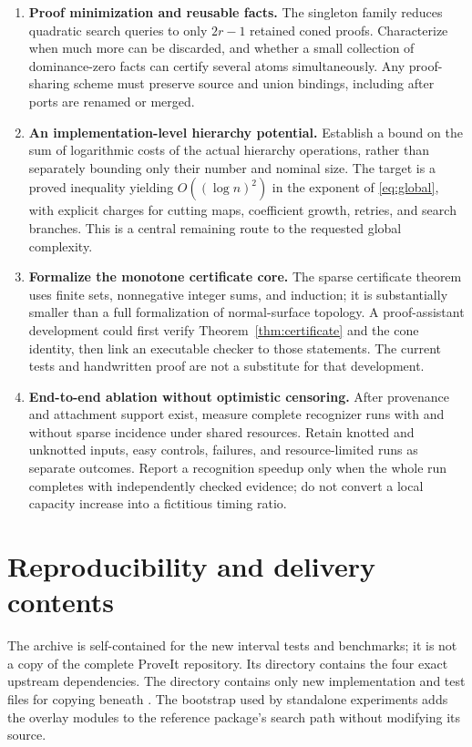 \documentclass[11pt,letterpaper]{article}
\theoremstyle{definition}
\begin{document}
\begin{enumerate}[leftmargin=*,label=\textbf{\arabic*.},itemsep=0.75em]
\item \textbf{Proof minimization and reusable facts.}
The singleton family reduces quadratic search queries to only $2r-1$
retained coned proofs. Characterize when much more can be discarded, and
whether a small collection of dominance-zero facts can certify several
atoms simultaneously. Any proof-sharing scheme must preserve source and
union bindings, including after ports are renamed or merged.

\item \textbf{An implementation-level hierarchy potential.}
Establish a bound on the sum of logarithmic costs of the actual hierarchy
operations, rather than separately bounding only their number and nominal
size. The target is a proved inequality yielding
$O((\log n)^2)$ in the exponent of \eqref{eq:global}, with explicit charges
for cutting maps, coefficient growth, retries, and search branches. This
is a central remaining route to the requested global complexity.

\item \textbf{Formalize the monotone certificate core.}
The sparse certificate theorem uses finite sets, nonnegative integer sums,
and induction; it is substantially smaller than a full formalization of
normal-surface topology. A proof-assistant development could first verify
Theorem~\ref{thm:certificate} and the cone identity, then link an executable
checker to those statements. The current tests and handwritten proof are
not a substitute for that development.

\item \textbf{End-to-end ablation without optimistic censoring.}
After provenance and attachment support exist, measure complete recognizer
runs with and without sparse incidence under shared resources. Retain
knotted and unknotted inputs, easy controls, failures, and resource-limited
runs as separate outcomes. Report a recognition speedup only when the
whole run completes with independently checked evidence; do not convert
a local capacity increase into a fictitious timing ratio.
\end{enumerate}

\section{Reproducibility and delivery contents}\label{sec:repro}
The archive is self-contained for the new interval tests and benchmarks;
it is not a copy of the complete ProveIt repository. Its 
directory contains the four exact upstream dependencies. The
 directory contains only new implementation and test files
for copying beneath . The bootstrap used
by standalone experiments adds the overlay modules to the reference
package's search path without modifying its source.
\end{document}
